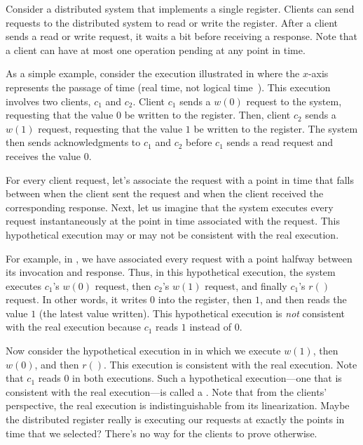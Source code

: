 Consider a distributed system that implements a single register. Clients can
send requests to the distributed system to read or write the register. After a
client sends a read or write request, it waits a bit before receiving a
response. Note that a client can have at most one operation pending at any
point in time.

{}

As a simple example, consider the execution illustrated in
 where the $x$-axis represents the passage of
time (real time, not logical time~\cite{lamport2019time}). This execution
involves two clients, $c_1$ and $c_2$. Client $c_1$ sends a $w(0)$ request to
the system, requesting that the value $0$ be written to the register. Then,
client $c_2$ sends a $w(1)$ request, requesting that the value $1$ be written
to the register. The system then sends acknowledgments to $c_1$ and $c_2$
before $c_1$ sends a read request and receives the value $0$.

For every client request, let's associate the request with a point in time that
falls between when the client sent the request and when the client received the
corresponding response. Next, let us imagine that the system executes every
request instantaneously at the point in time associated with the request. This
hypothetical execution may or may not be consistent with the real execution.

For example, in , we have associated every
request with a point halfway between its invocation and response. Thus, in this
hypothetical execution, the system executes $c_1$'s $w(0)$ request, then
$c_2$'s $w(1)$ request, and finally $c_1$'s $r()$ request. In other words, it
writes $0$ into the register, then $1$, and then reads the value $1$ (the
latest value written). This hypothetical execution is \emph{not} consistent
with the real execution because $c_1$ reads $1$ instead of $0$.

Now consider the hypothetical execution in 
in which we execute $w(1)$, then $w(0)$, and then $r()$. This execution is
consistent with the real execution. Note that $c_1$ reads $0$ in both
executions. Such a hypothetical execution---one that is consistent with the
real execution---is called a . Note that from the
clients' perspective, the real execution is indistinguishable from its
linearization. Maybe the distributed register really is executing our requests
at exactly the points in time that we selected? There's no way for the clients
to prove otherwise.

